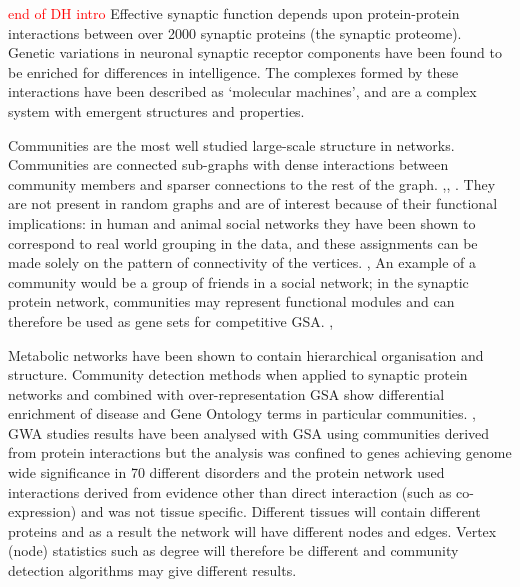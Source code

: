\textcolor{red}{end of DH intro}
Effective synaptic function depends upon protein-protein interactions between over 2000 synaptic proteins (the synaptic proteome). Genetic variations in neuronal synaptic receptor components have been found to be enriched for differences in intelligence. \cite{hill2014human}  The complexes formed by these interactions have been described as ‘molecular machines’, and are a complex system with emergent structures and properties. \cite{grant2012synaptopathies}




Communities  are the most well studied large-scale structure in networks. \cite{newman2012communities}  Communities are connected sub-graphs with dense interactions between community members and sparser connections to the rest of the graph. \cite{newman2012communities},\cite{fortunato2016community},\cite{girvan2002community} . They are not present in random graphs and are of interest because of their functional implications: in human and animal social networks they have been shown to correspond to real world grouping in the data, and these assignments can be made solely on the pattern of connectivity of the vertices. \cite{adamic2005political},\cite{zachary1977information}  An example of a community would be a group of friends in a social network; in the synaptic protein network, communities may represent functional modules and can therefore be used as gene sets for competitive GSA.  \cite{pocklington2006proteomes},\cite{mclean2016improved}  

Metabolic networks have been shown to contain hierarchical organisation and structure.\cite{ravasz2002hierarchical} Community detection methods when applied to synaptic protein networks and combined with over-representation GSA show differential enrichment of disease and Gene Ontology terms in particular communities. \cite{pocklington2006proteomes},\cite{mclean2016improved}  GWA studies results have been analysed with GSA using communities derived from protein interactions but the analysis was confined to genes achieving genome wide significance in 70 different disorders and the protein network used interactions derived from evidence other than direct interaction (such as co-expression) and was not tissue specific. \cite{ghiassian2015disease} 
Different tissues will contain different proteins and as a result the network will have different nodes and edges. Vertex (node) statistics such as degree will therefore be different and  community detection algorithms may give different results.


